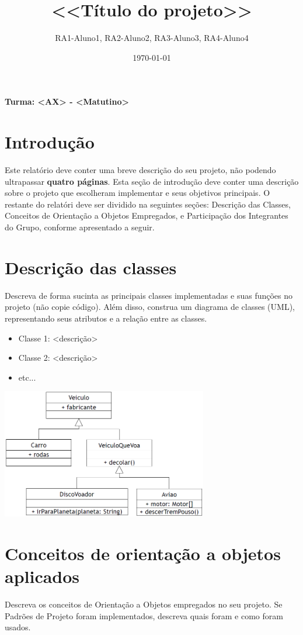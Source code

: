 \documentclass[]{article}
\title{<<Título do projeto>>}
\author{RA1-Aluno1, RA2-Aluno2, RA3-Aluno3, RA4-Aluno4}
\date{\today}
\begin{document}
\maketitle

\centerline{\textbf{Turma: <AX> - <Matutino>}}

\section{Introdução}
Este relatório deve conter uma breve descrição do seu projeto, não podendo ultrapassar \textbf{quatro páginas}. Esta seção de introdução deve conter uma descrição sobre o projeto que escolheram implementar e seus objetivos principais. O restante do relatóri deve ser dividido na seguintes seções: Descrição das Classes, Conceitos de Orientação a Objetos Empregados, e Participação dos Integrantes do Grupo, conforme apresentado a seguir. 

\section{Descrição das classes}
Descreva de forma sucinta as principais classes implementadas e suas funções no projeto (não copie código). Além disso, construa um diagrama de classes (UML), representando seus atributos e a relação entre as classes.

\begin{itemize}
	\item Classe 1: <descrição>
	\item Classe 2: <descrição>
	\item etc...
\end{itemize}

\begin{center}
\includegraphics[width=9cm]{UML_exemplo.PNG}
\end{center}

\section{Conceitos de orientação a objetos aplicados}
Descreva os conceitos de Orientação a Objetos empregados no seu projeto. Se Padrões de Projeto foram implementados, descreva quais foram e como foram usados.
\end{document}
